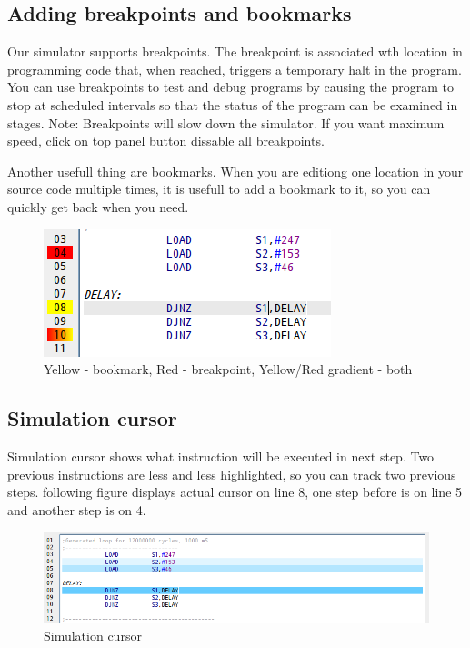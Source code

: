     \subsection{Adding breakpoints and bookmarks}
        Our simulator supports breakpoints. The breakpoint is associated wth location in programming code that, when reached, triggers a temporary halt in the program.
        You can use breakpoints to test and debug programs by causing the program to stop at scheduled intervals so that the status of
        the program can be examined in stages. Note: Breakpoints will slow down the simulator. If you want maximum speed, click on top panel
        button dissable all breakpoints.
        
        Another usefull thing are bookmarks. When you are editiong one location in your source code multiple times, it is usefull to add a bookmark to it,
        so you can quickly get back when you need.
        
        \begin{figure}[h!]
            \centering
            \includegraphics[width=.4\textwidth]{img/NewImg/breakpoints1.png}
            \caption{Yellow - bookmark, Red - breakpoint, Yellow/Red gradient - both}
        \end{figure}

    \subsection{Simulation cursor}
        Simulation cursor shows what instruction will be executed in next step. Two previous instructions are less and less highlighted, so you can track
        two previous steps. following figure displays actual cursor on line 8, one step before is on line 5 and another step is on 4.
        \begin{figure}[h!]
            \centering
            \includegraphics[width=\textwidth]{img/NewImg/simulationcursor1.png}
            \caption{Simulation cursor}
        \end{figure}
        
